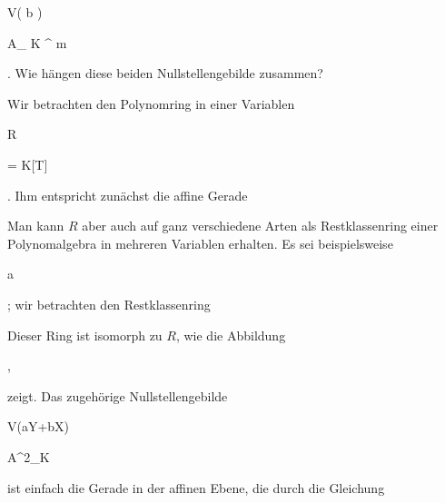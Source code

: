 \mavergleichskette

{\vergleichskette

{ V( {\mathfrak b} )
}

{ \subseteq }{  { {\mathbb A}_{ K }^{ m  } }
}

{  }{
}

{    }{
}

{   }{
}

}
{}{}{.}
Wie hängen diese beiden Nullstellengebilde zusammen?



{


Wir betrachten den Polynomring in einer Variablen


\mavergleichskette

{\vergleichskette

{ R
}

{ = }{ K[T]
}

{  }{
}

{    }{
}

{   }{
}

}
{}{}{.}
Ihm entspricht zunächst die affine Gerade

 Man kann $R$ aber auch auf ganz verschiedene Arten als Restklassenring einer Polynomalgebra in mehreren Variablen erhalten. Es sei beispielsweise


 {}

 {a } {}

 {} {} {} {;}
wir betrachten den Restklassenring

 Dieser Ring ist
 {} {}
isomorph zu $R$, wie die Abbildung


 { , }


zeigt. Das zugehörige Nullstellengebilde


\mavergleichskette

{\vergleichskette

{ V(aY+bX)
}

{ \subset }{ {\mathbb A}^{2}_{K}
}

{  }{
}

{    }{
}

{   }{
}

}
{}{}{}
ist einfach die Gerade in der affinen Ebene, die durch die Gleichung


\mavergleichskette

}
